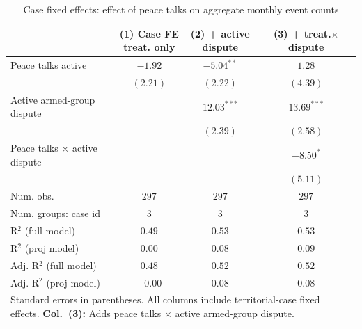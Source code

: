 
\begin{table}
\caption{Case fixed effects: effect of peace talks on aggregate monthly event counts}
\begin{center}
\begin{tabular}{l c c c}
\toprule
 & \makecell{(1) Case FE\\treat. only} & \makecell{(2) + active\\dispute} & \makecell{(3) + treat.$\times$\\dispute} \\
\midrule
Peace talks active           & $-1.92$  & $-5.04^{**}$  & $1.28$        \\
                             & $(2.21)$ & $(2.22)$      & $(4.39)$      \\
Active armed-group dispute   &          & $12.03^{***}$ & $13.69^{***}$ \\
                             &          & $(2.39)$      & $(2.58)$      \\
Peace talks × active dispute &          &               & $-8.50^{*}$   \\
                             &          &               & $(5.11)$      \\
\midrule
Num. obs.                    & $297$    & $297$         & $297$         \\
Num. groups: case id        & $3$      & $3$           & $3$           \\
R$^2$ (full model)           & $0.49$   & $0.53$        & $0.53$        \\
R$^2$ (proj model)           & $0.00$   & $0.08$        & $0.09$        \\
Adj. R$^2$ (full model)      & $0.48$   & $0.52$        & $0.52$        \\
Adj. R$^2$ (proj model)      & $-0.00$  & $0.08$        & $0.08$        \\
\bottomrule
\multicolumn{4}{l}{\scriptsize{\parbox{\linewidth}{Standard errors in parentheses.\\[0.35em] All columns include territorial-case fixed effects.\\[0.35em] \textbf{Col.~(3):} Adds peace talks $\times$ active armed-group dispute.}}}
\end{tabular}
\label{tab:results_case_fe}
\end{center}
\end{table}
